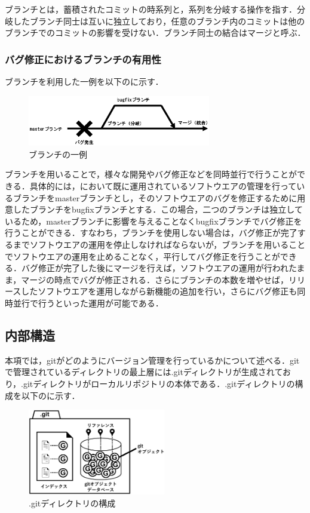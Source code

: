 \documentclass[a4j,9pt,twocolumn]{jsarticle}
\begin{document}
ブランチとは，蓄積されたコミットの時系列と，系列を分岐する操作を指す．分岐したブランチ同士は互いに独立しており，任意のブランチ内のコミットは他のブランチでのコミットの影響を受けない．ブランチ同士の結合はマージと呼ぶ．

\subsubsection{バグ修正におけるブランチの有用性}
ブランチを利用した一例を以下のに示す．

\begin{figure}[h]
\centering
\includegraphics[width=80mm]{img/branch.eps}
\caption{ブランチの一例}
\label{branch_ex}
\end{figure}

ブランチを用いることで，様々な開発やバグ修正などを同時並行で行うことができる．具体的には，において既に運用されているソフトウエアの管理を行っているブランチをmasterブランチとし，そのソフトウエアのバグを修正するために用意したブランチをbugfixブランチとする．この場合，二つのブランチは独立しているため，masterブランチに影響を与えることなくbugfixブランチでバグ修正を行うことができる．すなわち，ブランチを使用しない場合は，バグ修正が完了するまでソフトウエアの運用を停止しなければならないが，ブランチを用いることでソフトウエアの運用を止めることなく，平行してバグ修正を行うことができる．バグ修正が完了した後にマージを行えば，ソフトウエアの運用が行われたまま，マージの時点でバグが修正される．さらにブランチの本数を増やせば，リリースしたソフトウエアを運用しながら新機能の追加を行い，さらにバグ修正も同時並行で行うといった運用が可能である．

\subsection{内部構造}
本項では，gitがどのようにバージョン管理を行っているかについて述べる\cite{mecha}．gitで管理されているディレクトリの最上層には.gitディレクトリが生成されており，.gitディレクトリがローカルリポジトリの本体である．.gitディレクトリの構成を以下のに示す．

\begin{figure}[h]
\centering
\includegraphics[width=60mm]{img/git_obj.eps}
\caption{.gitディレクトリの構成}
\label{object1}
\end{figure}
\end{document}
